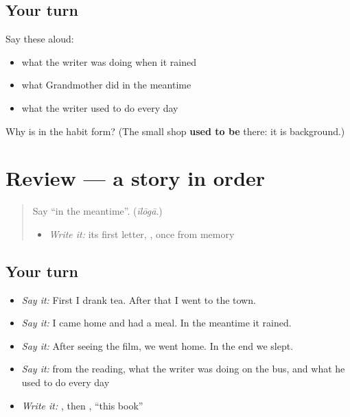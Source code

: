 \subsection*{Your turn}
Say these aloud:

\begin{itemize}
\raggedright
  \item what the writer was doing when it rained
  \item what Grandmother did in the meantime
  \item what the writer used to do every day
\end{itemize}

\begin{tcolorbox}[breakable,colback=teal!4,colframe=teal!35!black,title={Before you move on}]
Why is \textbf{} in the habit form? (The small shop \textbf{used to be} there: it is background.)
\end{tcolorbox}
\section[(review)]{Review — a story in order}

\label{lesson:TE-R317-a-story-in-order}



\begin{quote}
Say \textquotedblleft{}in the meantime\textquotedblright{}. (\emph{īlōgā}.)

\begin{itemize}
\raggedright
  \item \emph{Write it:} its first letter, \textbf{}, once from memory
\end{itemize}
\end{quote}

\subsection*{Your turn}
\begin{itemize}
\raggedright
  \item \emph{Say it:} First I drank tea. After that I went to the town.
  \item \emph{Say it:} I came home and had a meal. In the meantime it rained.
  \item \emph{Say it:} After seeing the film, we went home. In the end we slept.
  \item \emph{Say it:} from the reading, what the writer was doing on the bus, and what he used to do every day
  \item \emph{Write it:} \textbf{}, then \textbf{ }, \textquotedblleft{}this book\textquotedblright{}
\end{itemize}


